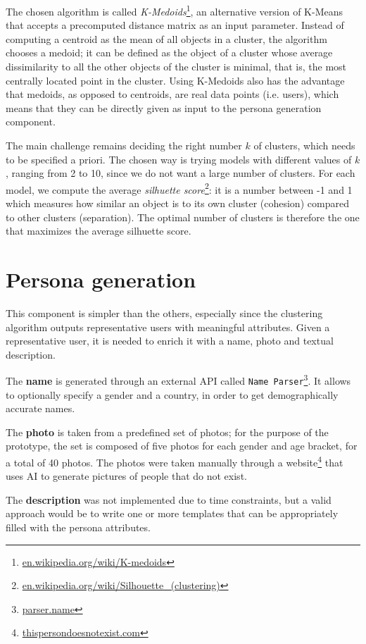 The chosen algorithm is called \emph{K-Medoids}\footnote{\url{en.wikipedia.org/wiki/K-medoids}}, an alternative version of K-Means that accepts a precomputed distance matrix as an input parameter. Instead of computing a centroid as the mean of all objects in a cluster, the algorithm chooses a medoid; it can be defined as the object of a cluster whose average dissimilarity to all the other objects of the cluster is minimal, that is, the most centrally located point in the cluster. Using K-Medoids also has the advantage that medoids, as opposed to centroids, are real data points (i.e. users), which means that they can be directly given as input to the persona generation component.

The main challenge remains deciding the right number $k$ of clusters, which needs to be specified a priori. The chosen way is trying models with different values of $k$, ranging from 2 to 10, since we do not want a large number of clusters. For each model, we compute the average \emph{silhuette score}\footnote{\url{en.wikipedia.org/wiki/Silhouette_(clustering)}}: it is a number between -1 and 1 which measures how similar an object is to its own cluster (cohesion) compared to other clusters (separation). The optimal number of clusters is therefore the one that maximizes the average silhuette score.

\section{Persona generation}
This component is simpler than the others, especially since the clustering algorithm outputs representative users with meaningful attributes. Given a representative user, it is needed to enrich it with a name, photo and textual description.

The \textbf{name} is generated through an external API called \texttt{Name Parser}\footnote{\url{parser.name}}. It allows to optionally specify a gender and a country, in order to get demographically accurate names.

The \textbf{photo} is taken from a predefined set of photos; for the purpose of the prototype, the set is composed of five photos for each gender and age bracket, for a total of 40 photos. The photos were taken manually through a website\footnote{\url{thispersondoesnotexist.com}} that uses AI to generate pictures of people that do not exist.

The \textbf{description} was not implemented due to time constraints, but a valid approach would be to write one or more templates that can be appropriately filled with the persona attributes.


